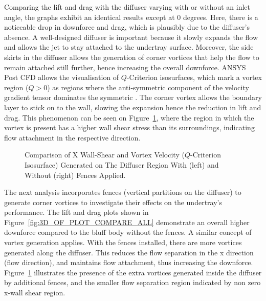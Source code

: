 \noindent Comparing the lift and drag with the diffuser varying with or without an inlet angle, the graphs exhibit an identical results except at 0 degrees. Here, there is a noticeable drop in downforce and drag, which is plausibly due to the diffuser's absence. A well-designed diffuser is important because it slowly expands the flow and allows the jet to stay attached to the undertray surface. Moreover, the side skirts in the diffuser allows the generation of corner vortices that help the flow to remain attached still further, hence increasing the overall downforce. ANSYS Post CFD allows the visualisation of $Q$-Criterion isosurfaces, which mark a vortex region ($Q > 0$) as regions where the anti-symmetric component of the velocity gradient tensor dominates the symmetric \cite{Holmen2012MethodsIdentification}. The corner vortex allows the boundary layer to stick on to the wall, slowing the expansion hence the reduction in lift and drag. This phenomenon can be seen on Figure~\ref{fig:3D_OF_COMPARE_FENCES_SHEAR}, where the region in which the vortex is present has a higher wall shear stress than its surroundings, indicating flow attachment in the respective direction.

\begin{figure}[!htb]
    \centering
    \noindent{}
    \caption{Comparison of X Wall-Shear and Vortex Velocity ($Q$-Criterion Isosurface) Generated on The Diffuser Region With (left) and Without (right) Fences Applied.}
      \label{fig:3D_OF_COMPARE_FENCES_SHEAR}
\end{figure}

\noindent The next analysis incorporates fences (vertical partitions on the diffuser) to generate corner vortices to investigate their effects on the undertray's performance. The lift and drag plots shown in Figure~\ref{fig:3D_OF_PLOT_COMPARE_ALL} demonstrate an overall higher downforce compared to the bluff body without the fences. A similar concept of vortex generation applies. With the fences installed, there are more vortices generated along the diffuser. This reduces the flow separation in the x direction (flow direction), and maintains flow attachment, thus increasing the downforce. Figure~\ref{fig:3D_OF_COMPARE_FENCES_SHEAR} illustrates the presence of the extra vortices generated inside the diffuser by additional fences, and the smaller flow separation region indicated by non zero x-wall shear region. 

